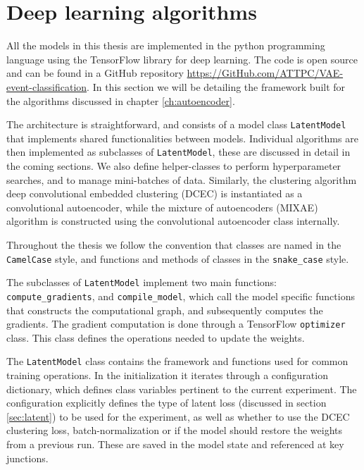 \section{Deep learning algorithms}

All the models in this thesis are implemented in the python programming language using the TensorFlow library for deep learning. The code is open source and can be found in a GitHub repository \url{https://GitHub.com/ATTPC/VAE-event-classification}. In this section we will be detailing the framework built for the algorithms discussed in chapter \ref{ch:autoencoder}.

The architecture is straightforward, and consists of a model class \lstinline{LatentModel} that implements shared functionalities between models. Individual algorithms are then implemented as subclasses of \lstinline{LatentModel}, these are discussed in detail in the coming sections. We also define helper-classes to perform hyperparameter searches, and to manage mini-batches of data. Similarly, the clustering algorithm deep convolutional embedded clustering (DCEC) is instantiated as a convolutional autoencoder, while the mixture of autoencoders (MIXAE) algorithm is constructed using the convolutional autoencoder class internally. 

Throughout the thesis we follow the convention that classes are named in the \lstinline{CamelCase} style, and functions and methods of classes in the \lstinline{snake_case} style. 

The subclasses of \lstinline{LatentModel} implement two main functions: \lstinline{compute_gradients}, and \lstinline{compile_model}, which call the model specific functions that constructs the computational graph, and subsequently computes the gradients. The gradient computation is done through a TensorFlow \lstinline{optimizer} class. This class defines the operations needed to update the weights. 

The \lstinline{LatentModel} class contains the framework and functions used for common training operations. In the initialization it iterates through a configuration dictionary, which defines class variables pertinent to the current experiment. The configuration explicitly defines the type of latent loss (discussed in section \ref{sec:latent}) to be used for the experiment, as well as whether to use the DCEC clustering loss, batch-normalization or if the model should restore the weights from a previous run. These are saved in the model state and referenced at key junctions.

